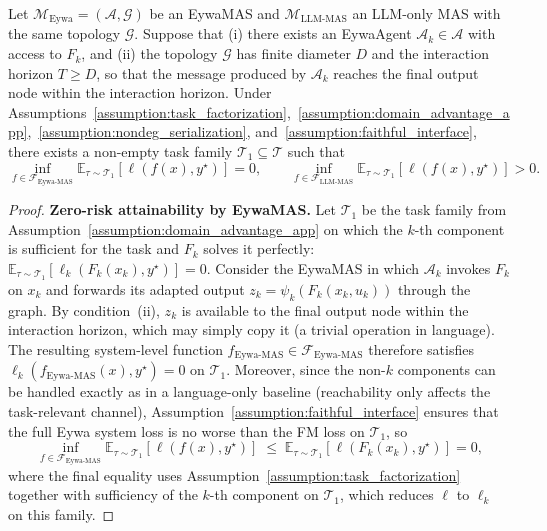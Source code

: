 \documentclass{llmxive}
\begin{document}
{\begin{theorem}
\label{thm:eywamas_app}
Let $\mathcal{M}_{\mathrm{Eywa}}=(\mathcal{A},\mathcal{G})$ be an EywaMAS and $\mathcal{M}_{\mathrm{LLM\text{-}MAS}}$ an LLM-only MAS with the same topology $\mathcal{G}$. Suppose that (i) there exists an EywaAgent $\mathcal{A}_k\in\mathcal{A}$ with access to $F_k$, and (ii) the topology $\mathcal{G}$ has finite diameter $D$ and the interaction horizon $T\ge D$, so that the message produced by $\mathcal{A}_k$ reaches the final output node within the interaction horizon. Under Assumptions~\ref{assumption:task_factorization},~\ref{assumption:domain_advantage_app},~\ref{assumption:nondeg_serialization}, and~\ref{assumption:faithful_interface}, there exists a non-empty task family $\mathcal{T}_1\subseteq\mathcal{T}$ such that
\begin{equation}
\inf_{f\in\mathcal{F}_{\mathrm{Eywa\text{-}MAS}}}\mathbb{E}_{\tau\sim\mathcal{T}_1}[\ell(f(x),y^\star)] = 0,
\qquad
\inf_{f\in\mathcal{F}_{\mathrm{LLM\text{-}MAS}}}\mathbb{E}_{\tau\sim\mathcal{T}_1}[\ell(f(x),y^\star)] > 0.
\end{equation}
\end{theorem}
\begin{proof}
\textbf{Zero-risk attainability by EywaMAS.} Let $\mathcal{T}_1$ be the task family from Assumption~\ref{assumption:domain_advantage_app} on which the $k$-th component is sufficient for the task and $F_k$ solves it perfectly: $\mathbb{E}_{\tau\sim\mathcal{T}_1}[\ell_k(F_k(x_k),y^\star)]=0$. Consider the EywaMAS in which $\mathcal{A}_k$ invokes $F_k$ on $x_k$ and forwards its adapted output $z_k=\psi_k(F_k(x_k,u_k))$ through the graph. By condition~(ii), $z_k$ is available to the final output node within the interaction horizon, which may simply copy it (a trivial operation in language). The resulting system-level function $f_{\mathrm{Eywa\text{-}MAS}}\in\mathcal{F}_{\mathrm{Eywa\text{-}MAS}}$ therefore satisfies $\ell_k(f_{\mathrm{Eywa\text{-}MAS}}(x),y^\star)=0$ on $\mathcal{T}_1$. Moreover, since the non-$k$ components can be handled exactly as in a language-only baseline (reachability only affects the task-relevant channel), Assumption~\ref{assumption:faithful_interface} ensures that the full Eywa system loss is no worse than the FM loss on $\mathcal{T}_1$, so
\begin{equation}
\inf_{f\in\mathcal{F}_{\mathrm{Eywa\text{-}MAS}}}\mathbb{E}_{\tau\sim\mathcal{T}_1}[\ell(f(x),y^\star)]
\;\le\;
\mathbb{E}_{\tau\sim\mathcal{T}_1}[\ell(F_k(x_k),y^\star)]=0,
\end{equation}
where the final equality uses Assumption~\ref{assumption:task_factorization} together with sufficiency of the $k$-th component on $\mathcal{T}_1$, which reduces $\ell$ to $\ell_k$ on this family.



\end{proof}}
\end{document}
